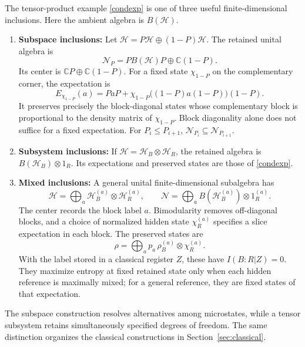 \documentclass[a4paper,11pt]{article}
\theoremstyle{definition}
\begin{document}
The tensor-product example \eqref{condexp} is one of three useful finite-dimensional
inclusions. Here the ambient algebra is $B(\mathcal H)$.
\begin{enumerate}
 \item {\bf Subspace inclusions:} Let $\mathcal H=P\mathcal H\oplus(1-P)\mathcal H$.
 The retained unital algebra is
 \[
  \mathcal N_P=P B(\mathcal H)P\oplus\mathbb C(1-P).
 \]
 Its center is $\mathbb CP\oplus\mathbb C(1-P)$. For a fixed state $\chi_{1-P}$
 on the complementary corner, the expectation is
 \[
  E_{\chi_{1-P}}(a)=PaP+
  \chi_{1-P}\bigl((1-P)a(1-P)\bigr)(1-P).
 \]
 It preserves precisely the block-diagonal states whose complementary block
 is proportional to the density matrix of $\chi_{1-P}$.
 Block diagonality alone does not suffice for a fixed expectation.
 For $P_i\leq P_{i+1}$, $\mathcal N_{P_i}\subseteq\mathcal N_{P_{i+1}}$.
 \item {\bf Subsystem inclusions:} If $\mathcal H=\mathcal H_B\otimes\mathcal H_R$,
 the retained algebra is $B(\mathcal H_B)\otimes1_R$.
 Its expectations and preserved states are those of \eqref{condexp}.
 \item {\bf Mixed inclusions:} A general unital finite-dimensional subalgebra has
 \[
  \mathcal H=\bigoplus_a\mathcal H_B^{(a)}\otimes\mathcal H_R^{(a)},\qquad
  \mathcal N=\bigoplus_a B(\mathcal H_B^{(a)})\otimes1_R^{(a)}.
 \]
 The center records the block label $a$. Bimodularity removes off-diagonal blocks,
 and a choice of normalized hidden state $\chi_R^{(a)}$ specifies a slice
 expectation in each block. The preserved states are
 \[
  \rho=\bigoplus_a p_a\,\rho_B^{(a)}\otimes\chi_R^{(a)}.
 \]
 With the label stored in a classical register $Z$, these have $I(B:R|Z)=0$.
 They maximize entropy at fixed retained state only when each hidden reference
 is maximally mixed; for a general reference, they are fixed states of that expectation.
\end{enumerate}
The subspace construction resolves alternatives among microstates, while a tensor
subsystem retains simultaneously specified degrees of freedom. The same distinction
organizes the classical constructions in Section~\ref{sec:classical}.
\end{document}
